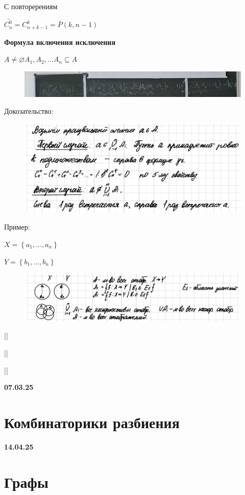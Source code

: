 \documentclass{article}
\begin{document}
\vspace{5mm}

С повторерениям 

$\bar{C_{n}^{0}} = C_{n+k-1}^{k} = \bar{P}(k,n-1)$


\textbf{Формула включения исключения}

$A \neq \varnothing A_1, A_2,...A_n \subseteq A$

\begin{figure}[H]
    \centering
    \includegraphics[width=1\linewidth]
    {12c36b33-baa5-41a2-b016-b02e7ad225c8.jpg}
\end{figure}

Докозательство:

\begin{figure}[H]
    \centering
    \includegraphics[width=1\linewidth]{Снимок экрана 2025-02-21 145919.png}
\end{figure}

Пример:

$X=\left\{a_1,...,a_n \right\}$

$Y=\left\{b_1,...,b_n\right\}$


\begin{figure}[H]
    \centering
    \includegraphics[width=1\linewidth]{Снимок экрана 2025-02-21 150506.png}
\end{figure}

||

||

||


\textbf{07.03.25}
\section{Комбинаторики разбиения}

\textbf{14.04.25}


\section{Графы}
\end{document}
